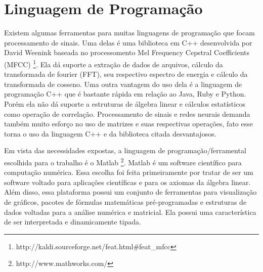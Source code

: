 \section{Linguagem de Programação}
\label{sec:linguagemprogramacao}

Existem algumas ferramentas para muitas linguagens de programação que focam processamento de sinais. Uma delas é uma biblioteca em C++ desenvolvida por David Weenink baseada no processomento Mel Frequency Cepstral Coefficients (MFCC) \footnote{http://kaldi.sourceforge.net/feat.html\#feat\_mfcc}. Ela dá suporte a extração de dados de arquivos, cálculo da transformada de fourier (FFT), seu respectivo espectro de energia e cálculo da transformada de cosseno. Uma outra vantagem do uso dela é a linguagem de programação C++ que é bastante rápida em relação ao Java, Ruby e Python. Porém ela não dá suporte a estruturas de álgebra linear e cálculos estatísticos como operação de correlação. Processamento de sinais e redes neurais demanda também muito esforço no uso de matrizes e suas respectivas operações, fato esse torna o uso da linguagem C++ e da biblioteca citada desvantajosos.

Em vista das necessidades expostas, a linguagem de programação/ferramental escolhida para o trabalho é o Matlab \footnote{http://www.mathworks.com/}. Matlab é um software científico para computação numérica. Essa escolha foi feita primeiramente por tratar de ser um software voltado para aplicações científicas e para os axiomas da álgebra linear. Além disso, essa plataforma possui um conjunto de ferramentas para visualização de gráficos, pacotes de fórmulas matemáticas pré-programadas e estruturas de dados voltadas para a análise numérica e matricial. Ela possui uma característica de ser interpretada e dinamicamente tipada.
